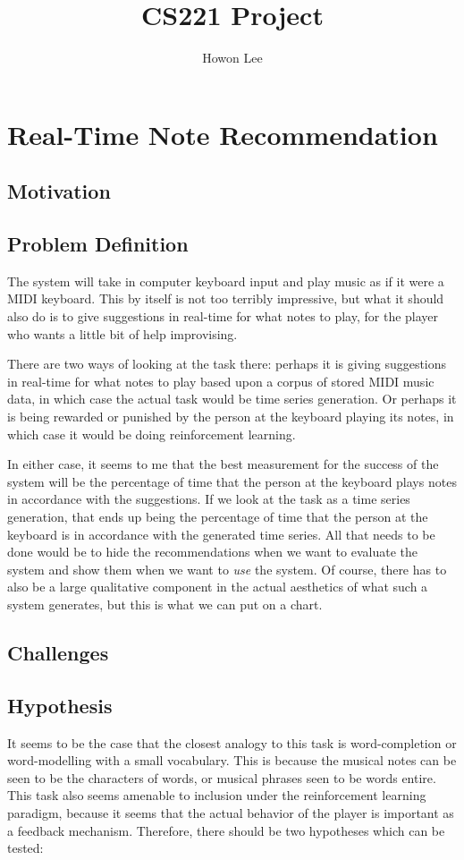 \documentclass{article}
\begin{document}
\title{CS221 Project}
\author{Howon Lee}
\maketitle
\section*{Real-Time Note Recommendation}

\subsection*{Motivation}
\subsection*{Problem Definition}
The system will take in computer keyboard input and play music as if it were a MIDI keyboard. This by itself is not too terribly impressive, but what it should also do is to give suggestions in real-time for what notes to play, for the player who wants a little bit of help improvising.

There are two ways of looking at the task there: perhaps it is giving suggestions in real-time for what notes to play based upon a corpus of stored MIDI music data, in which case the actual task would be time series generation. Or perhaps it is being rewarded or punished by the person at the keyboard playing its notes, in which case it would be doing reinforcement learning.

In either case, it seems to me that the best measurement for the success of the system will be the percentage of time that the person at the keyboard plays notes in accordance with the suggestions. If we look at the task as a time series generation, that ends up being the percentage of time that the person at the keyboard is in accordance with the generated time series. All that needs to be done would be to hide the recommendations when we want to evaluate the system and show them when we want to \emph{use} the system. Of course, there has to also be a large qualitative component in the actual aesthetics of what such a system generates, but this is what we can put on a chart. 

\subsection*{Challenges}

\subsection*{Hypothesis}
It seems to be the case that the closest analogy to this task is word-completion or word-modelling with a small vocabulary. This is because the musical notes can be seen to be the characters of words, or musical phrases seen to be words entire. This task also seems amenable to inclusion under the reinforcement learning paradigm, because it seems that the actual behavior of the player is important as a feedback mechanism. Therefore, there should be two hypotheses which can be tested:
\end{document}
